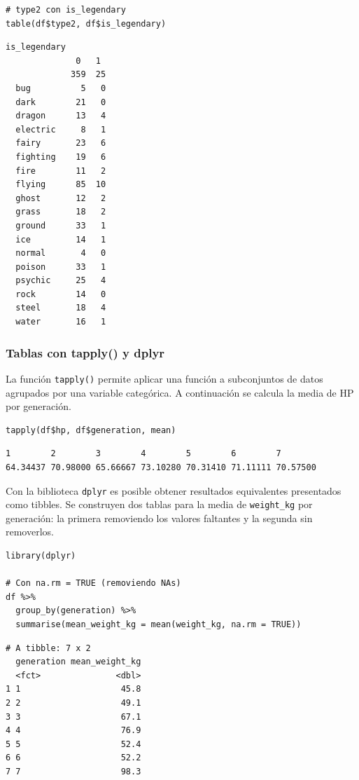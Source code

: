 \documentclass[11pt,a4paper]{article}
\begin{document}
\begin{lstlisting}[style=Rstyle]
# type2 con is_legendary
table(df$type2, df$is_legendary)
\end{lstlisting}

\begin{lstlisting}[style=Routput]
           is_legendary
              0   1
             359  25
  bug          5   0
  dark        21   0
  dragon      13   4
  electric     8   1
  fairy       23   6
  fighting    19   6
  fire        11   2
  flying      85  10
  ghost       12   2
  grass       18   2
  ground      33   1
  ice         14   1
  normal       4   0
  poison      33   1
  psychic     25   4
  rock        14   0
  steel       18   4
  water       16   1
\end{lstlisting}

\subsubsection{Tablas con tapply() y dplyr}

La función \texttt{tapply()} permite aplicar una función a subconjuntos de datos agrupados por
una variable categórica. A continuación se calcula la media de HP por generación.

\begin{lstlisting}[style=Rstyle]
tapply(df$hp, df$generation, mean)
\end{lstlisting}

\begin{lstlisting}[style=Routput]
       1        2        3        4        5        6        7
64.34437 70.98000 65.66667 73.10280 70.31410 71.11111 70.57500
\end{lstlisting}

Con la biblioteca \texttt{dplyr} es posible obtener resultados equivalentes presentados como tibbles.
Se construyen dos tablas para la media de \texttt{weight\_kg} por generación: la primera removiendo
los valores faltantes y la segunda sin removerlos.

\begin{lstlisting}[style=Rstyle]
library(dplyr)

# Con na.rm = TRUE (removiendo NAs)
df %>%
  group_by(generation) %>%
  summarise(mean_weight_kg = mean(weight_kg, na.rm = TRUE))
\end{lstlisting}

\begin{lstlisting}[style=Routput]
# A tibble: 7 x 2
  generation mean_weight_kg
  <fct>               <dbl>
1 1                    45.8
2 2                    49.1
3 3                    67.1
4 4                    76.9
5 5                    52.4
6 6                    52.2
7 7                    98.3
\end{lstlisting}
\end{document}
